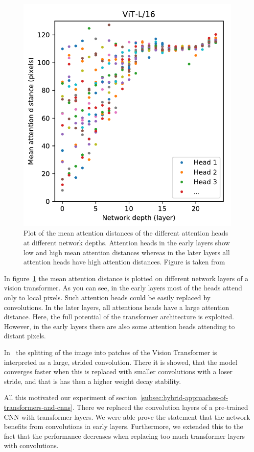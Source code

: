\documentclass[a4paper]{scrartcl}
\begin{document}
    \begin{figure}[btp]
        \centering
        \includegraphics[width=0.6\linewidth]{img/AttentionDistance}
        \caption[Attention distance]{Plot of the mean attention distances of the different attention heads at different network depths.
        Attention heads in the early layers show low and high mean attention distances whereas in the later layers all attention heads have high attention distances.
        Figure is taken from~\cite{dosovitskiy2021image}}
        \label{fig:attention-distance}
    \end{figure}

    In figure~\ref{fig:attention-distance} the mean attention distance is plotted on different network layers of a vision transformer.
    As you can see, in the early layers most of the heads attend only to local pixels.
    Such attention heads could be easily replaced by convolutions.
    In the later layers, all attentions heads have a large attention distance.
    Here, the full potential of the transformer architecture is exploited.
    However, in the early layers there are also some attention heads attending to distant pixels.

    In~\cite{xiao2021early} the splitting of the image into patches of the Vision Transformer is interpreted as a large, strided convolution.
    There it is showed, that the model converges faster when this is replaced with smaller convolutions with a loser stride, and that is has then a higher weight decay stability.

    All this motivated our experiment of section~\ref{subsec:hybrid-approaches-of-transformers-and-cnns}.
    There we replaced the convolution layers of a pre-trained CNN with transformer layers.
    We were able prove the statement that the network benefits from convolutions in early layers.
    Furthermore, we extended this to the fact that the performance decreases when replacing too much transformer layers with convolutions.
\end{document}
